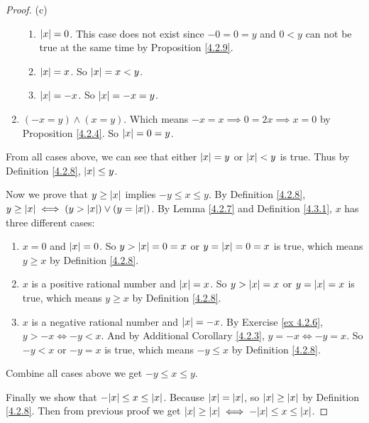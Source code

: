 \begin{proof}{(c)}
\begin{enumerate}[label=(\Roman*)]
\begin{enumerate}[label=(\roman*)]
        \item \(\abs*{x} = 0\).
        This case does not exist since \(-0 = 0 = y\) and \(0 < y\) can not be true at the same time by Proposition \ref{4.2.9}.
        \item \(\abs*{x} = x\).
        So \(\abs*{x} = x < y\).
        \item \(\abs*{x} = -x\).
        So \(\abs*{x} = -x = y\).
    \end{enumerate}
    \item \((-x = y) \land (x = y)\).
    Which means \(-x = x \implies 0 = 2x \implies x = 0\) by Proposition \ref{4.2.4}.
    So \(\abs*{x} = 0 = y\).
\end{enumerate}
From all cases above, we can see that either \(\abs*{x} = y\) or \(\abs*{x} < y\) is true.
Thus by Definition \ref{4.2.8}, \(\abs*{x} \leq y\).

Now we prove that \(y \geq \abs*{x}\) implies \(-y \leq x \leq y\).
By Definition \ref{4.2.8}, \(y \geq \abs*{x} \iff (y > \abs*{x}) \lor (y = \abs*{x})\).
By Lemma \ref{4.2.7} and Definition \ref{4.3.1}, \(x\) has three different cases:
\begin{enumerate}[label=(\roman*)]
    \item \(x = 0\) and \(\abs*{x} = 0\).
    So \(y > \abs*{x} = 0 = x\) or \(y = \abs*{x} = 0 = x\) is true, which means \(y \geq x\) by Definition \ref{4.2.8}.
    \item \(x\) is a positive rational number and \(\abs*{x} = x\).
    So \(y > \abs*{x} = x\) or \(y = \abs*{x} = x\) is true, which means \(y \geq x\) by Definition \ref{4.2.8}.
    \item \(x\) is a negative rational number and \(\abs*{x} = -x\).
    By Exercise \ref{ex 4.2.6}, \(y > -x \iff -y < x\).
    And by Additional Corollary \ref{4.2.3}, \(y = -x \iff -y = x\).
    So \(-y < x\) or \(-y = x\) is true, which means \(-y \leq x\) by Definition \ref{4.2.8}.
\end{enumerate}
Combine all cases above we get \(-y \leq x \leq y\).

Finally we show that \(-\abs*{x} \leq x \leq \abs*{x}\).
Because \(\abs*{x} = \abs*{x}\), so \(\abs*{x} \geq \abs*{x}\) by Definition \ref{4.2.8}.
Then from previous proof we get \(\abs*{x} \geq \abs*{x} \iff -\abs*{x} \leq x \leq \abs*{x}\).
\end{proof}

